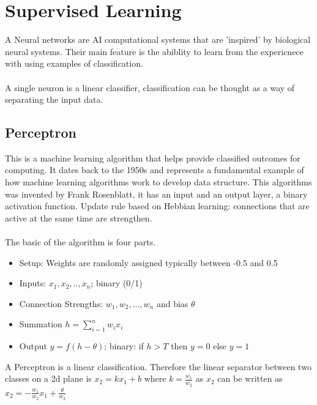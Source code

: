 \section{Supervised Learning}
A Neural networks are AI computational systems that are 'inspired' by biological neural systems. Their main feature is the abiblity to learn from the expericnece with using examples of classification.
\\\\
A single neuron is a linear classifier, classification can be thought as a way of separating the input data.


\subsection{Perceptron}
This is a machine learning algorithm that helps provide classified outcomes for computing. It dates back to the 1950s and represents a fundamental example of how machine learning algorithms work to develop data structure. This algorithms was invented by Frank Rosenblatt, it has an input and an output layer, a binary activation function. Update rule based on Hebbian learning: connections that are active at the same time are strengthen.
\\\\
The basic of the algorithm is four parts.
\begin{itemize}
    \item Setup: Weights are randomly assigned typically between -0.5 and 0.5
    \item Inputs: $x_1, x_2,..,x_n$; binary (0/1)
    \item Connection Strengths: $w_1,w_2,...,w_n$ and bias $\theta$
    \item Summation $ h = \sum_{i=1}^{n} w_i x_i$
    \item Output $y = f(h-\theta)$; binary: if $h > T$ then $y = 0$ else $y =1$
\end{itemize}
A Perceptron is a linear classification. Therefore the linear separator between two classes on a 2d plane is $x_2 = kx_1+b$ where $k = \frac{w_1}{w_2}$ as $x_2$ can be written as $x_2 = -\frac{w_1}{w_2}x_1 + \frac{\theta}{w_2}$
